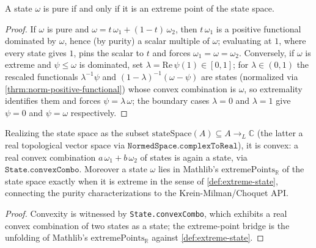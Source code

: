 \begin{theorem}
    \label{thrm:pure-iff-extreme}
    \leanok
    A state $\omega$ is pure if and only if it is an extreme point of the state space.
\end{theorem}
\begin{proof}
    \leanok
    If $\omega$ is pure and $\omega = t\,\omega_1 + (1-t)\,\omega_2$, then $t\,\omega_1$ is a positive functional dominated by $\omega$, hence (by purity) a scalar multiple of $\omega$; evaluating at $1$, where every state gives $1$, pins the scalar to $t$ and forces $\omega_1 = \omega = \omega_2$. Conversely, if $\omega$ is extreme and $\psi \le \omega$ is dominated, set $\lambda = \mathrm{Re}\,\psi(1) \in [0,1]$; for $\lambda \in (0,1)$ the rescaled functionals $\lambda^{-1}\psi$ and $(1-\lambda)^{-1}(\omega - \psi)$ are states (normalized via \ref{thrm:norm-positive-functional}) whose convex combination is $\omega$, so extremality identifies them and forces $\psi = \lambda\,\omega$; the boundary cases $\lambda = 0$ and $\lambda = 1$ give $\psi = 0$ and $\psi = \omega$ respectively.
\end{proof}

\begin{theorem}
    \label{thrm:state-space-convex-bridge}
    \leanok
    Realizing the state space as the subset $\mathrm{stateSpace}(A) \subseteq A \to_L \mathbb{C}$ (the latter a real topological vector space via $\texttt{NormedSpace.complexToReal}$), it is convex: a real convex combination $a\,\omega_1 + b\,\omega_2$ of states is again a state, via $\texttt{State.convexCombo}$. Moreover a state $\omega$ lies in Mathlib's $\mathrm{extremePoints}_{\mathbb{R}}$ of the state space exactly when it is extreme in the sense of \ref{def:extreme-state}, connecting the purity characterizations to the Krein-Milman/Choquet API.
\end{theorem}
\begin{proof}
    \leanok
    Convexity is witnessed by \texttt{State.convexCombo}, which exhibits a real convex combination of two states as a state; the extreme-point bridge is the unfolding of Mathlib's $\mathrm{extremePoints}_{\mathbb{R}}$ against \ref{def:extreme-state}.
\end{proof}

